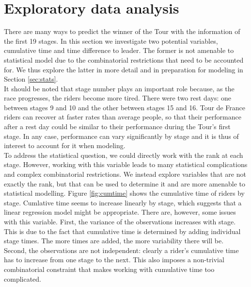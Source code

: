 \documentclass[aos,preprint]{imsart}
\begin{document}
\section{Exploratory data analysis} \label{sec:eda}


There are many ways to predict the winner of the Tour with the information of the first 19 stages. In this section we investigate two potential variables, cumulative time and time difference to leader. The former is not amenable to statistical model due to the combinatorial restrictions that need to be accounted for. We thus explore the latter in more detail and in preparation for modeling in Section \ref{sec:stats}. \\

It should be noted that stage number plays an important role because, as the race progresses, the riders become more tired. There were two rest days: one between stages 9 and 10 and the other between stages 15 and 16. Tour de France riders can recover at faster rates than average people, so that their performance after a rest day could be similar to their performance during the Tour's first stage. In any case, performance can vary significantly by stage and it is thus of interest to account for it when modeling. \\



To address the statistical question, we could directly work with the rank at each stage. However, working with this variable leads to many statistical complications and complex combinatorial restrictions. We instead explore variables that are not exactly the rank, but that can be used to determine it and are more amenable to statistical modelling. Figure \ref{fig:cumtime} shows the cumulative time of riders by stage. Cumlative time seems to increase linearly by stage, which suggests that a linear regression model might be appropriate. There are, however, some issues with this variable. First, the variance of the observations increases with stage. This is due to the fact that cumulative time is determined by adding individual stage times. The more times are added, the more variability there will be. Second, the observations are not independent: clearly a rider's cumulative time has to increase from one stage to the next. This also imposes a non-trivial combinatorial constraint that makes working with cumulative time too complicated. \\
\end{document}
